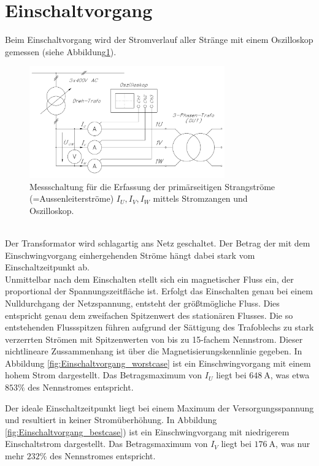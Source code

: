 \section{Einschaltvorgang}
Beim Einschaltvorgang wird der Stromverlauf aller Stränge mit einem Oszilloskop gemessen (siehe Abbildung\;\ref{fig:Einschaltvorgang_Messschaltung}).
\begin{figure}
    \centering
    \includegraphics[width=0.75\textwidth, angle=0]{2/images/Einschaltversuch.pdf}
    \caption{Messschaltung für die Erfassung der primärseitigen Strangströme (=Aussenleiterströme) $I_U, I_V, I_W$ mittels Stromzangen und Oszilloskop.}
    \label{fig:Einschaltvorgang_Messschaltung}
\end{figure}\\
\noindent Der Transformator wird schlagartig ans Netz geschaltet. Der Betrag der mit dem Einschwingvorgang einhergehenden Ströme hängt dabei stark vom Einschaltzeitpunkt ab.\\
Unmittelbar nach dem Einschalten stellt sich ein magnetischer Fluss ein, der proportional der Spannungszeitfläche ist. Erfolgt das Einschalten genau bei einem Nulldurchgang der Netzspannung, entsteht der größtmögliche Fluss. Dies entspricht genau dem zweifachen Spitzenwert des stationären Flusses. Die so entstehenden Flussspitzen führen aufgrund der Sättigung des Trafoblechs zu stark verzerrten Strömen mit Spitzenwerten von bis zu 15-fachem Nennstrom. Dieser nichtlineare Zussammenhang ist über die Magnetisierungskennlinie gegeben. In Abbildung \ref{fig:Einschaltvorgang_worstcase} ist ein Einschwingvorgang mit einem hohem Strom dargestellt. Das Betragsmaximum von $I_U$ liegt bei $\SI{648}{\ampere}$, was etwa $853\%$ des Nennstromes entspricht.



\noindent Der ideale Einschaltzeitpunkt liegt bei einem Maximum der Versorgungsspannung und resultiert in keiner Stromüberhöhung. In Abbildung \ref{fig:Einschaltvorgang_bestcase}) ist ein Einschwingvorgang mit niedrigerem Einschaltstrom dargestellt. Das Betragsmaximum von $I_V$ liegt bei $\SI{176}{\ampere}$, was nur mehr $232\%$ des Nennstromes entspricht.


\clearpage